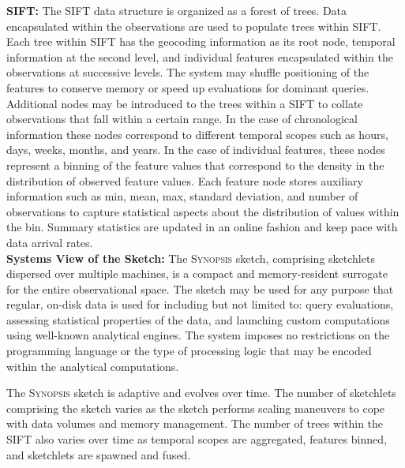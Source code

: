 \textbf{SIFT:} The SIFT data structure is organized as a forest of trees. Data encapsulated within the observations are used to populate trees within SIFT. Each tree within SIFT has the geocoding information as its root node, temporal information at the second level, and individual features encapsulated within the observations at successive levels. The system may shuffle positioning of the features to conserve memory or speed up evaluations for dominant queries.
%
\vspace{1em} \\
Additional nodes may be introduced to the trees within a SIFT to collate observations that fall within a certain range. In the case of chronological information these nodes correspond to different temporal scopes such as hours, days, weeks, months, and years. In the case of individual features, these nodes represent a binning of the feature values that correspond to the density in the distribution of observed feature values. Each feature node stores auxiliary information such as min, mean, max, standard deviation, and number of observations to capture statistical aspects about the distribution of values within the bin. Summary statistics are updated in an online fashion and keep pace with data arrival rates.
%
\vspace{1em} \\
\textbf{Systems View of the Sketch:} The \textsc{Synopsis} sketch, comprising sketchlets dispersed over multiple machines, is a compact and memory-resident surrogate for the entire observational space. The sketch may be used for any purpose that regular, on-disk data is used for including but not limited to: query evaluations, assessing statistical properties of the data, and launching custom computations using well-known analytical engines. The system imposes no restrictions on the programming language or the type of processing logic that may be encoded within the analytical computations. 

The \textsc{Synopsis} sketch is adaptive and evolves over time. The number of sketchlets comprising the sketch varies as the sketch performs scaling maneuvers to cope with data volumes and memory management. The number of trees within the SIFT  also varies over time as temporal scopes are aggregated, features binned, and sketchlets are spawned and fused.
